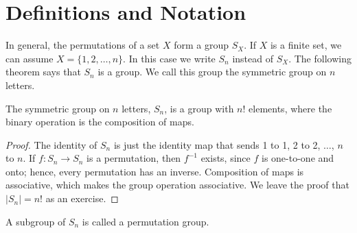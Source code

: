  
\section{Definitions and Notation}
 
In general, the permutations of a set $X$ form a group $S_X$. If $X$
is a finite set, we can assume $X=\{ 1, 2, \ldots, n\}$. In this case
we write $S_n$\label{symmetricgroup} instead of $S_X$. The following
theorem says that $S_n$ is a group. We call this group the {\bfi
symmetric group on $n$ letters}. 

\begin{theorem}
The symmetric group on $n$ letters, $S_n$, is a group with $n!$
elements, where the binary operation is the composition of maps.
\end{theorem}

\begin{proof}
The identity of $S_n$ is just the identity map that sends 1 to 1, 2 to
2, $\ldots$, $n$ to $n$. If $f : S_n \rightarrow S_n$ is a
permutation, then $f^{-1}$ exists, since $f$ is one-to-one and onto;
hence, every permutation has an inverse. Composition of maps is
associative, which makes the group operation associative. We leave the
proof that $|S_n|= n!$ as an exercise.
\end{proof}

\medskip

A subgroup of $S_n$ is called a {\bfi permutation
group}.

